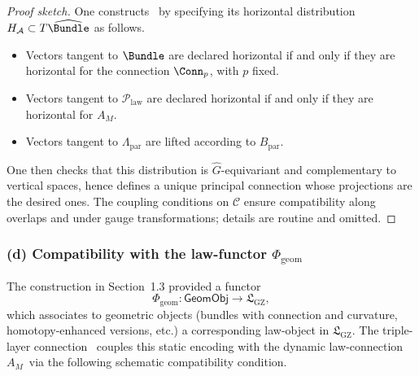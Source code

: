 \documentclass[11pt]{book}
\theoremstyle{plain}
\theoremstyle{definition}
\newcommand{\GZLS}{\ensuremath{\mathfrak{L}_{\mathrm{GZ}}}}       \newcommand{\GZLT}{\ensuremath{M_{!w}}}                           \newcommand{\GZLOC}{\ensuremath{A_M}}                             \newcommand{\GZLCurv}{\ensuremath{\mathcal{F}_{\mathrm{law}}}}
\begin{document}
\begin{proof}[Proof sketch]
One constructs \GZTLC\ by specifying its horizontal distribution
  $H_{\mathcal{A}}\subset T\widehat{\Bundle}$ as follows.

  \begin{itemize}
    \item Vectors tangent to $\Bundle$ are declared horizontal if and
          only if they are horizontal for the connection $\Conn_p$,
          with $p$ fixed.
    \item Vectors tangent to $\mathcal{P}_{\mathrm{law}}$ are declared
          horizontal if and only if they are horizontal for \GZLOC.
    \item Vectors tangent to $\Lambda_{\mathrm{par}}$ are lifted
          according to $B_{\mathrm{par}}$.
  \end{itemize}

  One then checks that this distribution is $\widehat{G}$-equivariant
  and complementary to vertical spaces, hence defines a unique
  principal connection whose projections are the desired ones. The
  coupling conditions on $\mathcal{C}$ ensure compatibility along
  overlaps and under gauge transformations; details are routine and
  omitted.
\end{proof}



\subsubsection*{(d) Compatibility with the law-functor \texorpdfstring{$\Phi_{\mathrm{geom}}$}{Phi\_geom}}

The construction in Section~1.3 provided a functor
\[
   \Phi_{\mathrm{geom}}:
      \mathsf{GeomObj}\longrightarrow\GZLS,
\]
which associates to geometric objects (bundles with connection and
curvature, homotopy-enhanced versions, etc.) a corresponding
law-object in \GZLS. The triple-layer connection \GZTLC\ couples this
static encoding with the dynamic law-connection \GZLOC\ via the
following schematic compatibility condition.
\end{document}
